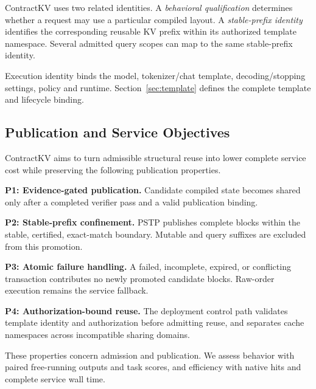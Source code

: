 ContractKV uses two related identities. A \emph{behavioral qualification} determines whether a request may use a particular compiled layout. A \emph{stable-prefix identity} identifies the corresponding reusable KV prefix within its authorized template namespace. Several admitted query scopes can map to the same stable-prefix identity.

Execution identity binds the model, tokenizer/chat template, decoding/stopping settings, policy and runtime. Section~\ref{sec:template} defines the complete template and lifecycle binding.

\subsection{Publication and Service Objectives}
ContractKV aims to turn admissible structural reuse into lower complete service cost while preserving the following publication properties.

\noindent\textbf{P1: Evidence-gated publication.} Candidate compiled state becomes shared only after a completed verifier pass and a valid publication binding.

\noindent\textbf{P2: Stable-prefix confinement.} PSTP publishes complete blocks within the stable, certified, exact-match boundary. Mutable and query suffixes are excluded from this promotion.

\noindent\textbf{P3: Atomic failure handling.} A failed, incomplete, expired, or conflicting transaction contributes no newly promoted candidate blocks. Raw-order execution remains the service fallback.

\noindent\textbf{P4: Authorization-bound reuse.} The deployment control path validates template identity and authorization before admitting reuse, and separates cache namespaces across incompatible sharing domains.

These properties concern admission and publication. We assess behavior with paired free-running outputs and task scores, and efficiency with native hits and complete service wall time.
